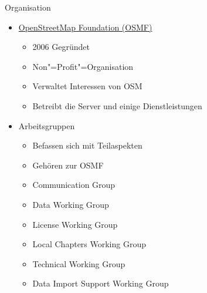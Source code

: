 \documentclass{beamer}
\begin{document}
\begin{frame}{Organisation}
    \pause
    \begin{itemize}
        \item \href{http://www.osmfoundation.org/}{OpenStreetMap Foundation (OSMF)}
            \begin{itemize}
                \item 2006 Gegründet
                \item Non"=Profit"=Organisation
                \item Verwaltet Interessen von OSM
                \item Betreibt die Server und einige Dienstleistungen
            \end{itemize}
        \vfill\pause
        \item Arbeitsgruppen
            \begin{itemize}
                \item Befassen sich mit Teilaspekten
                \item Gehören zur OSMF
            \end{itemize}
            \begin{itemize}
                \scriptsize
                \item Communication Group
                \item Data Working Group
                \item License Working Group
                \item Local Chapters Working Group
                \item Technical Working Group
                \item Data Import Support Working Group
            \end{itemize}
    \end{itemize}
\end{frame}
\end{document}
